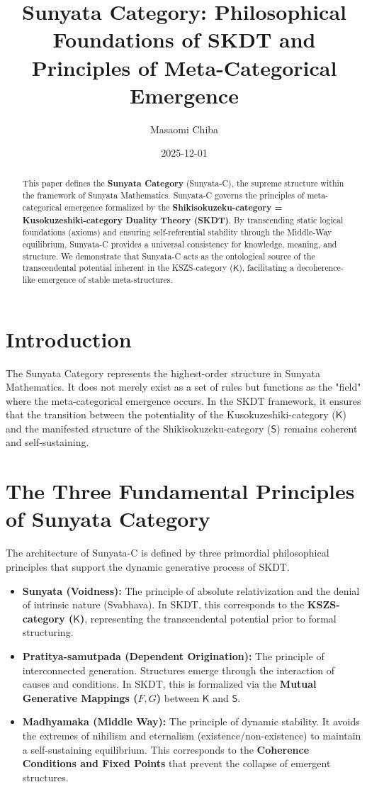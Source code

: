 \documentclass[12pt,a4paper]{article}
\title{Sunyata Category: Philosophical Foundations of SKDT and Principles of Meta-Categorical Emergence}
\author{Masaomi Chiba}
\date{2025-12-01}
\begin{document}
\maketitle

\begin{abstract}
This paper defines the \textbf{Sunyata Category} (Sunyata-C), the supreme structure within the framework of Sunyata Mathematics. Sunyata-C governs the principles of meta-categorical emergence formalized by the \textbf{Shikisokuzeku-category = Kusokuzeshiki-category Duality Theory (SKDT)}. By transcending static logical foundations (axioms) and ensuring self-referential stability through the Middle-Way equilibrium, Sunyata-C provides a universal consistency for knowledge, meaning, and structure. We demonstrate that Sunyata-C acts as the ontological source of the transcendental potential inherent in the KSZS-category ($\mathsf{K}$), facilitating a decoherence-like emergence of stable meta-structures.
\end{abstract}

\section{Introduction}
The Sunyata Category represents the highest-order structure in Sunyata Mathematics. It does not merely exist as a set of rules but functions as the "field" where the meta-categorical emergence occurs. In the SKDT framework, it ensures that the transition between the potentiality of the Kusokuzeshiki-category ($\mathsf{K}$) and the manifested structure of the Shikisokuzeku-category ($\mathsf{S}$) remains coherent and self-sustaining.

\section{The Three Fundamental Principles of Sunyata Category}
The architecture of Sunyata-C is defined by three primordial philosophical principles that support the dynamic generative process of SKDT.

\begin{itemize}
    \item \textbf{Sunyata (Voidness):} The principle of absolute relativization and the denial of intrinsic nature (Svabhava). In SKDT, this corresponds to the \textbf{KSZS-category ($\mathsf{K}$)}, representing the transcendental potential prior to formal structuring.
    \item \textbf{Pratitya-samutpada (Dependent Origination):} The principle of interconnected generation. Structures emerge through the interaction of causes and conditions. In SKDT, this is formalized via the \textbf{Mutual Generative Mappings ($F, G$)} between $\mathsf{K}$ and $\mathsf{S}$.
    \item \textbf{Madhyamaka (Middle Way):} The principle of dynamic stability. It avoids the extremes of nihilism and eternalism (existence/non-existence) to maintain a self-sustaining equilibrium. This corresponds to the \textbf{Coherence Conditions and Fixed Points} that prevent the collapse of emergent structures.
\end{itemize}
\end{document}
